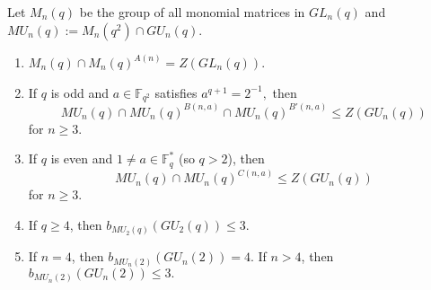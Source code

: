 \begin{Lem} \label{omnom}
Let $M_n(q)$ be the group of all monomial matrices in $GL_n(q)$ and $MU_n(q):=M_n(q^2) \cap GU_n(q)$. %
\begin{enumerate}[font=\normalfont]
\item $M_n(q) \cap M_n(q)^{A(n)}=Z(GL_n(q))$. \label{omnom1}
\item If $q$ is odd and $a \in \mathbb{F}_{q^2}$ satisfies $a^{q+1}=2^{-1},$ then 
$$MU_n(q) \cap MU_n(q)^{B(n,a)} \cap MU_n(q)^{B'(n,a)} \le Z(GU_n(q))$$ for $n \ge 3.$ \label{omnom2}
\item If $q$ is even and $1 \ne a \in \mathbb{F}_q^*$ (so $q>2$), then
$$MU_n(q) \cap MU_n(q)^{C(n,a)}  \le Z(GU_n(q))$$ for $n \ge 3.$ \label{omnom3}
 \item If $q\ge 4$, then $b_{MU_2(q)}(GU_2(q))\le 3.$ \label{omnom4}
 \item If $n=4$, then $b_{MU_n(2)}(GU_n(2))=4.$ If $n>4$, then $b_{MU_n(2)}(GU_n(2))\le 3.$ \label{omnom5}
\end{enumerate}
\end{Lem}
